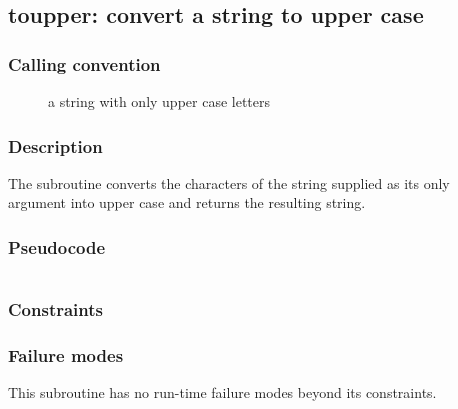 \clearpage
{}
{}
\label{subr:toupper}
\subsection*{toupper: convert a string to upper case}

\subsubsection*{Calling convention}

\begin{description}
\item[] a string with only upper case letters
\end{description}

\subsubsection*{Description}

The  subroutine converts the characters of the
string supplied as its only argument into upper case and returns the
resulting string.

\subsubsection*{Pseudocode}

\begin{verbatim}
\end{verbatim}

\subsubsection*{Constraints}

\subsubsection*{Failure modes}

This subroutine has no run-time failure modes beyond its constraints.
